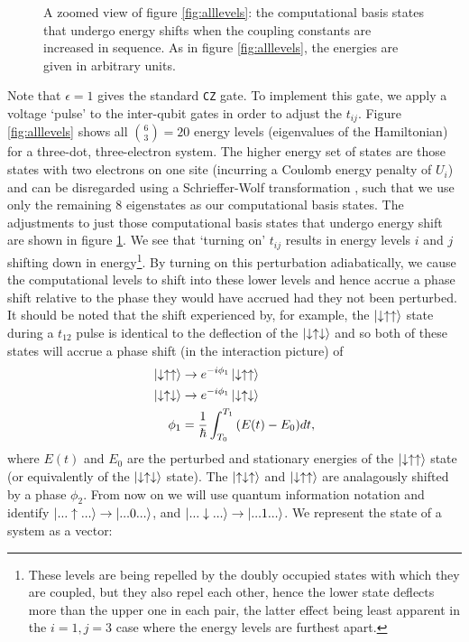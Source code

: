 \documentclass{report}
\begin{document}
\begin{appendices}
\begin{figure}[ht]
    \caption{A zoomed view of figure \ref{fig:alllevels}: the computational basis states that undergo energy shifts when the coupling constants are increased in sequence. As in figure \ref{fig:alllevels}, the energies are given in arbitrary units.}
    \label{fig:complevels}
\end{figure}

Note that $\epsilon = 1$ gives the standard \texttt{CZ} gate. To implement this gate, we apply a voltage `pulse' to the inter-qubit gates in order to adjust the $t_{ij}$. Figure \ref{fig:alllevels} shows all $\binom{6}{3} = 20$ energy levels (eigenvalues of the Hamiltonian) for a three-dot, three-electron system. The higher energy set of states are those states with two electrons on one site (incurring a Coulomb energy penalty of $U_i$) and can be disregarded using a Schrieffer-Wolf transformation \cite{bravyi_2011}, such that we use only the remaining 8 eigenstates as our computational basis states. The adjustments to just those computational basis states that undergo energy shift are shown in figure \ref{fig:complevels}. We see that `turning on' $t_{ij}$ results in energy levels $i$ and $j$ shifting down in energy\footnote{These levels are being repelled by the doubly occupied states with which they are coupled, but they also repel each other, hence the lower state deflects more than the upper one in each pair, the latter effect being least apparent in the $i = 1, j = 3$ case where the energy levels are furthest apart.}. By turning on this perturbation adiabatically, we cause the computational levels to shift into these lower levels and hence accrue a phase shift relative to the phase they would have accrued had they not been perturbed. It should be noted that the shift experienced by, for example, the $\ket{\downarrow\uparrow\uparrow}$ state during a $t_{12}$ pulse is identical to the deflection of the $\ket{\downarrow\uparrow\downarrow}$ and so both of these states will accrue a phase shift (in the interaction picture) of 
\begin{align*}
    \ket{\downarrow\uparrow\uparrow} &\rightarrow e^{-i\phi_1} \ket{\downarrow\uparrow\uparrow}\\
    \ket{\downarrow\uparrow\downarrow} &\rightarrow e^{-i\phi_1} \ket{\downarrow\uparrow\downarrow}\\
    \phi_1 &= \frac{1}{\hbar}\int_{T_0}^{T_1}{(E(t) - E_0)dt},
\end{align*} where $E(t)$ and $E_0$ are the perturbed and stationary energies of the $\ket{\downarrow\uparrow\uparrow}$ state (or equivalently of the $\ket{\downarrow\uparrow\downarrow}$ state). The $\ket{\uparrow\downarrow\uparrow}$ and $\ket{\downarrow\uparrow\uparrow}$ are analagously shifted by a phase $\phi_2$. From now on we will use quantum information notation and identify $\ket{...\uparrow...} \rightarrow \ket{...0...}$, and $\ket{...\downarrow...} \rightarrow \ket{...1...}$. We represent the state of a system as a vector:

\end{appendices}
\end{document}
